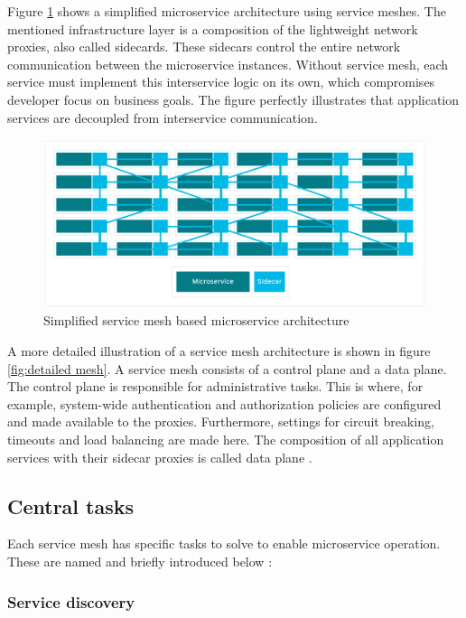 Figure \ref{fig:overview} shows a simplified microservice architecture using service meshes. The mentioned infrastructure layer is a composition of the lightweight network proxies, also called sidecards. These sidecars control the entire network communication between the microservice instances. Without service mesh, each service must implement this interservice logic on its own, which compromises developer focus on business goals. The figure perfectly illustrates that application services are decoupled from interservice communication.

\begin{figure}
    \includegraphics[width=\columnwidth]{img/mesh.png}
    \caption{Simplified service mesh based microservice architecture \cite{sm2}}
    \label{fig:overview}
\end{figure}

A more detailed illustration of a service mesh architecture is shown in figure \ref{fig:detailed mesh}. A service mesh consists of a control plane and a data plane.
The control plane is responsible for administrative tasks. This is where, for example, system-wide authentication and authorization policies are configured and made available to the proxies. Furthermore, settings for circuit breaking, timeouts and load balancing are made here. The composition of all application services with their sidecar proxies is called data plane \cite{sm4}.

\subsection{Central tasks}

Each service mesh has specific tasks to solve to enable microservice operation. These are named and briefly introduced below \cite{sm1}:

\subsubsection{Service discovery}

